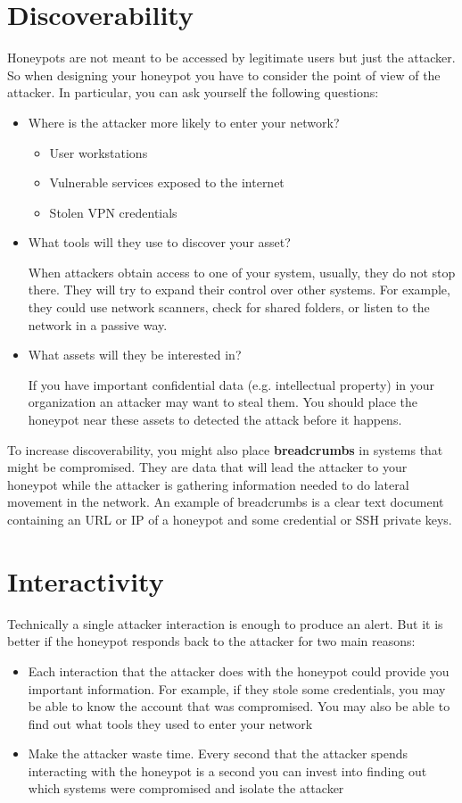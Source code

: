 \documentclass[epsfig,a4paper,11pt,titlepage,oneside,openany]{book}
\begin{document}
\section{Discoverability}
Honeypots are not meant to be accessed by legitimate users but just the attacker. So when designing your honeypot you have to consider the point of view of the attacker.
In particular, you can ask yourself the following questions:
\begin{itemize}
\item Where is the attacker more likely to enter your network?
	\begin{itemize}
	\item User workstations
	\item Vulnerable services exposed to the internet
	\item Stolen VPN credentials
	\end{itemize}
\item What tools will they use to discover your asset?

When attackers obtain access to one of your system, usually, they do not stop there. They will try to expand their control over other systems. For example, they could use network scanners, check for shared folders, or listen to the network in a passive way.
\item What assets will they be interested in?

If you have important confidential data (e.g. intellectual property) in your organization an attacker may want to steal them. You should place the honeypot near these assets to detected the attack before it happens. 
\end{itemize}

To increase discoverability, you might also place \textbf{breadcrumbs} in systems that might be compromised. They are data that will lead the attacker to your honeypot while the attacker is gathering information needed to do lateral movement in the network. An example of breadcrumbs is a clear text document containing an URL or IP of a honeypot and some credential or SSH private keys.

\section{Interactivity}

Technically a single attacker interaction is enough to produce an alert. But it is better if the honeypot responds back to the attacker for two main reasons:
\begin{itemize}
\item Each interaction that the attacker does with the honeypot could provide you important information. For example, if they stole some credentials, you may be able to know the account that was compromised. You may also be able to find out what tools they used to enter  your network
\item Make the attacker waste time. Every second that the attacker spends interacting with the honeypot is a second you can invest into finding out which systems were compromised and isolate the attacker
\end{itemize}
\end{document}
